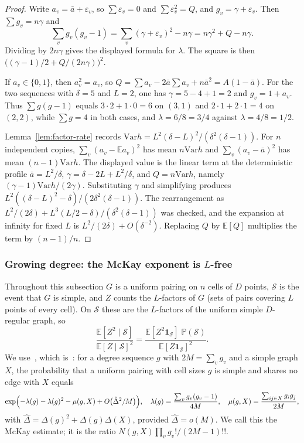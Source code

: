 \documentclass[11pt]{article}
\newcommand{\EE}{\mathbb{E}}
\newcommand{\PP}{\mathbb{P}}
\newcommand{\Var}{\mathrm{Var}}
\begin{document}
\begin{proof}
Write \(a_v=\bar a+\varepsilon_v\), so \(\sum\varepsilon_v=0\) and
\(\sum\varepsilon_v^2=Q\), and \(g_v=\gamma+\varepsilon_v\). Then
\(\sum g_v=n\gamma\) and
\[
\sum_v g_v(g_v-1)
=
\sum_v(\gamma+\varepsilon_v)^2-n\gamma
=
n\gamma^2+Q-n\gamma.
\]
Dividing by \(2n\gamma\) gives the displayed formula for \(\lambda\).
The square is then
\(\bigl((\gamma-1)/2+Q/(2n\gamma)\bigr)^2\).

If \(a_v\in\{0,1\}\), then \(a_v^2=a_v\), so
\(Q=\sum a_v-2\bar a\sum a_v+n\bar a^2=A(1-\bar a)\).
For the two sequences with \(\delta=5\) and \(L=2\), one has
\(\gamma=5-4+1=2\) and \(g_v=1+a_v\). Thus
\(\sum g(g-1)\) equals \(3\cdot 2+1\cdot 0=6\) on \((3,1)\) and
\(2\cdot 1+2\cdot 1=4\) on \((2,2)\), while \(\sum g=4\) in both cases, and
\(\lambda=6/8=3/4\) against \(\lambda=4/8=1/2\).

Lemma~\ref{lem:factor-rate} records
\(\Var h=L^2(\delta-L)^2/(\delta^2(\delta-1))\). For \(n\) independent copies,
\(\sum_v(a_v-\EE a_v)^2\) has mean \(n\Var h\) and
\(\sum_v(a_v-\bar a)^2\) has mean \((n-1)\Var h\).
The displayed value is the linear term at the deterministic profile
\(\bar a=L^2/\delta\), \(\gamma=\delta-2L+L^2/\delta\), and \(Q=n\Var h\),
namely \((\gamma-1)\Var h/(2\gamma)\). Substituting \(\gamma\) and simplifying
produces \(L^2((\delta-L)^2-\delta)/(2\delta^2(\delta-1))\).
The rearrangement as \(L^2/(2\delta)+L^3(L/2-\delta)/(\delta^2(\delta-1))\) was
checked, and the expansion at infinity for fixed \(L\) is
\(L^2/(2\delta)+O(\delta^{-2})\). Replacing \(Q\) by \(\EE[Q]\) multiplies the
term by \((n-1)/n\).
\end{proof}

\subsubsection*{Growing degree: the McKay exponent is \(L\)-free}

Throughout this subsection \(G\) is a uniform pairing on \(n\) cells of \(D\)
points, \(\mathcal S\) is the event that \(G\) is simple, and \(Z\) counts the
\(L\)-factors of \(G\) (sets of pairs covering \(L\) points of every cell). On
\(\mathcal S\) these are the \(L\)-factors of the uniform simple \(D\)-regular
graph, so
\[
\frac{\EE[Z^2\mid\mathcal S]}{\EE[Z\mid\mathcal S]^2}
=
\frac{\EE[Z^2\mathbf 1_{\mathcal S}]\;\PP(\mathcal S)}{\EE[Z\mathbf 1_{\mathcal S}]^2}.
\tag{\(\ast\)}
\]
We use~\cite[Theorem~14]{Gao21}, which is~\cite[Theorem~4.6]{McK85}: for a
degree sequence \(g\) with \(2M=\sum_v g_v\) and a simple graph \(X\), the
probability that a uniform pairing with cell sizes \(g\) is simple and shares
no edge with \(X\) equals
\[
\exp\Bigl(-\lambda(g)-\lambda(g)^2-\mu(g,X)+O\bigl(\hat\Delta^2/M\bigr)\Bigr),
\quad
\lambda(g)=\frac{\sum_v g_v(g_v-1)}{4M},
\quad
\mu(g,X)=\frac{\sum_{ij\in X}g_ig_j}{2M},
\]
with \(\hat\Delta=\Delta(g)^2+\Delta(g)\Delta(X)\), provided
\(\hat\Delta=o(M)\). We call this the McKay estimate; it is the ratio
\(N(g,X)\prod_v g_v!/(2M-1)!!\).
\end{document}
